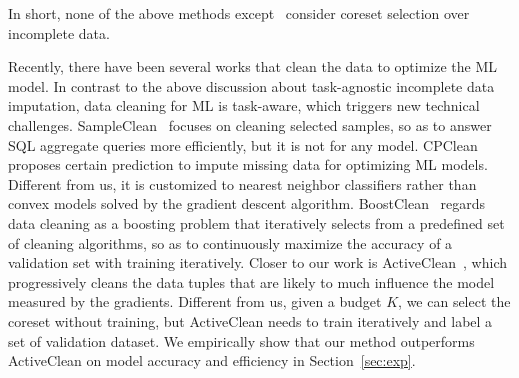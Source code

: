 In short, none of the above methods except~\cite{goodcore}  consider coreset selection over incomplete data.


 Recently, there have  been several works that clean the data to optimize the ML model. 
In contrast to the above discussion about task-agnostic incomplete data imputation, data cleaning for ML is task-aware, which triggers new technical challenges.
SampleClean~\cite{DBLP:journals/debu/KrishnanWFGKM015} focuses on cleaning selected samples, so as to answer  SQL aggregate  queries  more efficiently, but it is not for any model.
%
 CPClean~\cite{DBLP:journals/pvldb/KarlasLWGC0020} proposes certain prediction to impute missing data for optimizing ML models. Different from us, it is customized to nearest neighbor classifiers rather than convex models solved by the gradient descent algorithm. 
  BoostClean~\cite{DBLP:journals/corr/abs-1711-01299} regards data cleaning as a boosting problem that iteratively
 selects from a predefined set of cleaning algorithms, so as to continuously maximize the accuracy of  a validation set with training iteratively. 
Closer to our work is ActiveClean~\cite{DBLP:journals/pvldb/KrishnanWWFG16}, which progressively cleans the data tuples that are likely to much influence the model   measured by the gradients. 
Different from us,  given a budget $K$, we can select the coreset without training, but ActiveClean needs to train iteratively  and label a set of   validation  dataset.  We empirically show that our method outperforms ActiveClean on model accuracy and efficiency in Section~\ref{sec:exp}.



